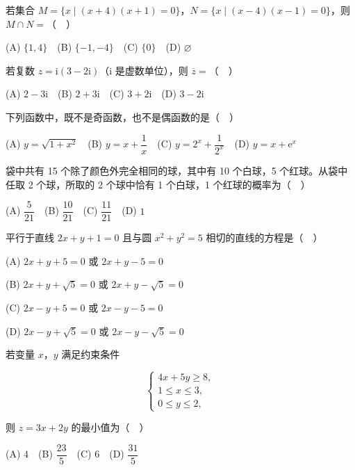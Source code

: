\begin{question}
若集合 \(M=\{x\mid (x+4)(x+1)=0\}\)，\(N=\{x\mid (x-4)(x-1)=0\}\)，则 \(M\cap N=\)（　）

(A) \(\{1,4\}\)　(B) \(\{-1,-4\}\)　(C) \(\{0\}\)　(D) \(\varnothing\)

\end{question}
\begin{question}
若复数 \(z=\mathrm{i}(3-2\mathrm{i})\)（\(\mathrm{i}\) 是虚数单位），则 \(\overline{z}=\)（　）

(A) \(2-3\mathrm{i}\)　(B) \(2+3\mathrm{i}\)　(C) \(3+2\mathrm{i}\)　(D) \(3-2\mathrm{i}\)

\end{question}
\begin{question}
下列函数中，既不是奇函数，也不是偶函数的是（　）

(A) \(y=\sqrt{1+x^2}\)　(B) \(y=x+\dfrac{1}{x}\)　(C) \(y=2^x+\dfrac{1}{2^x}\)　(D) \(y=x+\mathrm{e}^x\)

\end{question}
\begin{question}
袋中共有 15 个除了颜色外完全相同的球，其中有 10 个白球，5 个红球。从袋中任取 2 个球，所取的 2 个球中恰有 1 个白球，1 个红球的概率为（　）

(A) \(\dfrac{5}{21}\)　(B) \(\dfrac{10}{21}\)　(C) \(\dfrac{11}{21}\)　(D) \(1\)

\end{question}
\begin{question}
平行于直线 \(2x+y+1=0\) 且与圆 \(x^2+y^2=5\) 相切的直线的方程是（　）

(A) \(2x+y+5=0\) 或 \(2x+y-5=0\)

(B) \(2x+y+\sqrt{5}=0\) 或 \(2x+y-\sqrt{5}=0\)

(C) \(2x-y+5=0\) 或 \(2x-y-5=0\)

(D) \(2x-y+\sqrt{5}=0\) 或 \(2x-y-\sqrt{5}=0\)

\end{question}
\begin{question}
若变量 \(x\)，\(y\) 满足约束条件

\nopagebreak[4]
\[
\begin{cases}
4x+5y\geqslant 8,\\
1\leqslant x\leqslant 3,\\
0\leqslant y\leqslant 2,
\end{cases}
\]

则 \(z=3x+2y\) 的最小值为（　）

(A) \(4\)　(B) \(\dfrac{23}{5}\)　(C) \(6\)　(D) \(\dfrac{31}{5}\)

\end{question}

